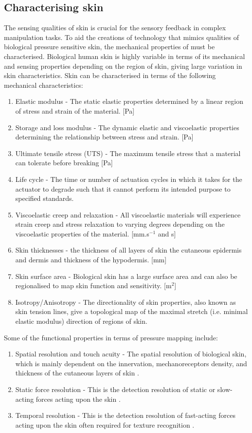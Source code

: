 \subsection{Characterising skin}
\label{subsec:Characterising skin}
The sensing qualities of skin is crucial for the sensory feedback in complex manipulation tasks. To aid the creations of technology that mimics qualities of biological pressure sensitive skin, the mechanical properties of must be characterised. Biological human skin is highly variable in terms of its mechanical and sensing properties depending on the region of skin, giving large variation in skin characteristics. Skin can be characterised in terms of the following mechanical characteristics:
\begin{enumerate}
    \item Elastic modulus -  The static elastic properties determined by a linear region of stress and strain of the material. [Pa]
    \item Storage and loss modulus - The dynamic elastic and viscoelastic properties determining the relationship between stress and strain. [Pa]
    \item Ultimate tensile stress (UTS) - The maximum tensile stress that a material can tolerate before breaking [Pa]
    \item Life cycle - The time or number of actuation cycles in which it takes for the actuator to degrade such that it cannot perform its intended purpose to specified standards.
    \item Viscoelastic creep and relaxation - All viscoelastic materials will experience strain creep and stress relaxation to varying degrees depending on the viscoelastic properties of the material. [mm.s$^{-1}$ and s]
    \item Skin thicknesses - the thickness of all layers of skin the cutaneous epidermis and dermis and thickness of the hypodermis. [mm]
    \item Skin surface area - Biological skin has a large surface area and can also be regionalised to map skin function and sensitivity. [m$^2$]
    \item Isotropy/Anisotropy - The directionality of skin properties, also known as skin tension lines, give a topological map of the maximal stretch (i.e. minimal elastic modulus) direction of regions of skin.
\end{enumerate}
Some of the functional properties in terms of pressure mapping include:
\begin{enumerate}
    \item Spatial resolution and touch acuity - The spatial resolution of biological skin, which is mainly dependent on the innervation, mechanoreceptors density, and thickness of the cutaneous layers of skin \cite{Landry2021,Klein2016,Krotoski1993}.
    \item Static force resolution - This is the detection resolution of static or slow-acting forces acting upon the skin \cite{Krotoski1993}.
    \item Temporal resolution - This is the detection resolution of fast-acting forces acting upon the skin often required for texture recognition \cite{Landry2021,Krotoski1993}.
\end{enumerate}

